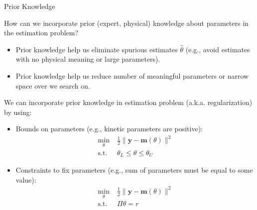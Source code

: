 \documentclass[9pt]{beamer}
\begin{document}
%
\begin{frame}{Prior Knowledge}

\begin{block}{}
How can we incorporate prior (expert, physical) knowledge about parameters in the estimation problem? 
\end{block}
\begin{itemize}
\item Prior knowledge help us eliminate spurious estimates $\hat{\theta}$ (e.g., avoid estimates with no physical meaning or large parameters). 
\item Prior knowledge help us reduce number of meaningful parameters or narrow space over we search on.
\end{itemize}
We can incorporate prior knowledge in estimation problem (a.k.a. regularization) by using: 
\begin{itemize}
\item Bounds on parameters (e.g., kinetic parameters are positive):
\begin{align*}
\min_{\theta}& \; \frac{1}{2}\|\mathbf{y}- \mathbf{m}(\theta)\|^2\\ 
\textrm{s.t.}&\; \theta_L\leq \theta\leq\theta_U 
\end{align*}
\item Constraints to fix parameters (e.g., sum of parameters must be equal to some value):
\begin{align*}
\min_{\theta}& \; \frac{1}{2}\|\mathbf{y}- \mathbf{m}(\theta)\|^2\\ 
\textrm{s.t.}&\; \Pi \theta = r
\end{align*}

\end{itemize}
\end{frame}
\end{document}

